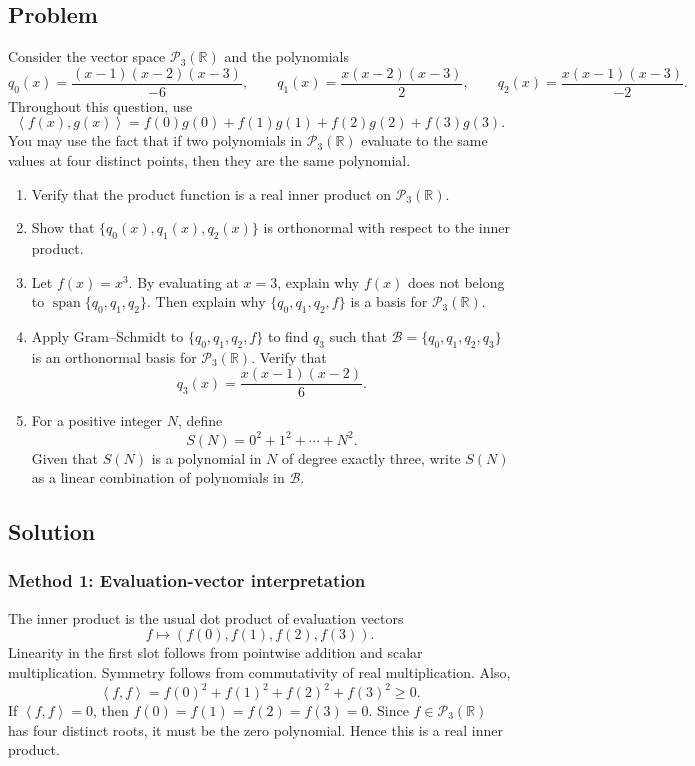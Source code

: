 \documentclass[12pt]{article}
\newcommand{\R}{\mathbb{R}}
\newcommand{\B}{\mathcal{B}}
\newcommand{\Ppoly}{\mathcal{P}}
\newcommand{\Span}{\operatorname{span}}
\newcommand{\ip}[2]{\left\langle #1,#2\right\rangle}
\begin{document}
\subsection{Problem}
Consider the vector space $\Ppoly_3(\R)$ and the polynomials
\[
q_0(x)=\frac{(x-1)(x-2)(x-3)}{-6},
\qquad
q_1(x)=\frac{x(x-2)(x-3)}{2},
\qquad
q_2(x)=\frac{x(x-1)(x-3)}{-2}.
\]
Throughout this question, use
\[
\ip{f(x)}{g(x)}=f(0)g(0)+f(1)g(1)+f(2)g(2)+f(3)g(3).
\]
You may use the fact that if two polynomials in $\Ppoly_3(\R)$ evaluate to the same values at four distinct points, then they are the same polynomial.
\begin{enumerate}[label=(\alph*)]
  \item Verify that the product function is a real inner product on $\Ppoly_3(\R)$.
  \item Show that $\{q_0(x),q_1(x),q_2(x)\}$ is orthonormal with respect to the inner product.
  \item Let $f(x)=x^3$. By evaluating at $x=3$, explain why $f(x)$ does not belong to $\Span\{q_0,q_1,q_2\}$. Then explain why $\{q_0,q_1,q_2,f\}$ is a basis for $\Ppoly_3(\R)$.
  \item Apply Gram--Schmidt to $\{q_0,q_1,q_2,f\}$ to find $q_3$ such that $\B=\{q_0,q_1,q_2,q_3\}$ is an orthonormal basis for $\Ppoly_3(\R)$. Verify that
  \[
  q_3(x)=\frac{x(x-1)(x-2)}6.
  \]
  \item For a positive integer $N$, define
  \[
  S(N)=0^2+1^2+\cdots+N^2.
  \]
  Given that $S(N)$ is a polynomial in $N$ of degree exactly three, write $S(N)$ as a linear combination of polynomials in $\B$.
\end{enumerate}

\subsection{Solution}

\subsubsection{Method 1: Evaluation-vector interpretation}
The inner product is the usual dot product of evaluation vectors
\[
f\longmapsto (f(0),f(1),f(2),f(3)).
\]
Linearity in the first slot follows from pointwise addition and scalar multiplication. Symmetry follows from commutativity of real multiplication. Also,
\[
\ip{f}{f}=f(0)^2+f(1)^2+f(2)^2+f(3)^2\ge0.
\]
If $\ip{f}{f}=0$, then $f(0)=f(1)=f(2)=f(3)=0$. Since $f\in\Ppoly_3(\R)$ has four distinct roots, it must be the zero polynomial. Hence this is a real inner product.
\end{document}
